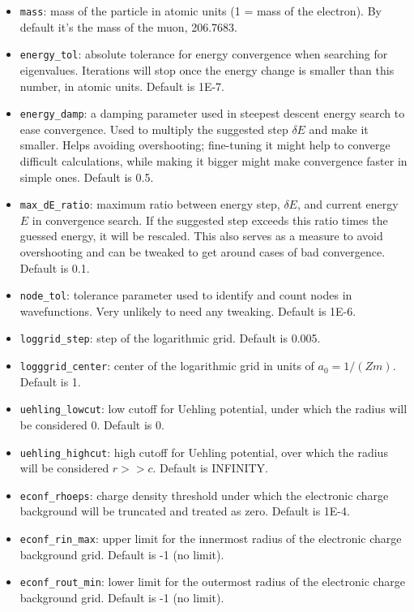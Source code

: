 \documentclass[]{article}
\begin{document}
\begin{itemize}
	\item \texttt{mass}: mass of the particle in atomic units (1 = mass of the electron). By default it's the mass of the muon, 206.7683.
	\item \texttt{energy\_tol}: absolute tolerance for energy convergence when searching for eigenvalues. Iterations will stop once the energy change is smaller than this number, in atomic units. Default is 1E-7.
	\item \texttt{energy\_damp}: a damping parameter used in steepest descent energy search to ease convergence. Used to multiply the suggested step $\delta E$ and make it smaller. Helps avoiding overshooting; fine-tuning it might help to converge difficult calculations, while making it bigger might make convergence faster in simple ones. Default is 0.5.
	\item \texttt{max\_dE\_ratio}: maximum ratio between energy step, $\delta E$, and current energy $E$ in convergence search. If the suggested step exceeds this ratio times the guessed energy, it will be rescaled. This also serves as a measure to avoid overshooting and can be tweaked to get around cases of bad convergence. Default is 0.1.
	\item \texttt{node\_tol}: tolerance parameter used to identify and count nodes in wavefunctions. Very unlikely to need any tweaking. Default is 1E-6.
	\item \texttt{loggrid\_step}: step of the logarithmic grid. Default is 0.005.
	\item \texttt{logggrid\_center}: center of the logarithmic grid in units of $a_0 = 1/(Zm)$. Default is 1.
	\item \texttt{uehling\_lowcut}: low cutoff for Uehling potential, under which the radius will be considered 0. Default is 0.
	\item \texttt{uehling\_highcut}: high cutoff for Uehling potential, over which the radius will be considered $r >> c$. Default is INFINITY.
	\item \texttt{econf\_rhoeps}: charge density threshold under which the electronic charge background will be truncated and treated as zero. Default is 1E-4.
	\item \texttt{econf\_rin\_max}: upper limit for the innermost radius of the electronic charge background grid. Default is -1 (no limit).
	\item \texttt{econf\_rout\_min}: lower limit for the outermost radius of the electronic charge background grid. Default is -1 (no limit).

\end{itemize}
\end{document}
